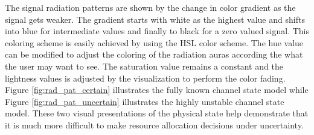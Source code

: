 The signal radiation patterns are shown by the change in color gradient as the signal gets weaker.  The gradient starts with white as the highest value and shifts into blue for intermediate values and finally to black for a zero valued signal.  This coloring scheme is easily achieved by using the HSL color scheme.  The hue value can be modified to adjust the coloring of the radiation auras according the what the user may want to see.  The saturation value remains a constant and the lightness values is adjusted by the visualization to perform the color fading.  Figure \ref{fig:rad_pat_certain} illustrates the fully known channel state model while Figure \ref{fig:rad_pat_uncertain} illustrates the highly unstable channel state model.  These two visual presentations of the physical state help demonstrate that it is much more difficult to make resource allocation decisions under uncertainty.

